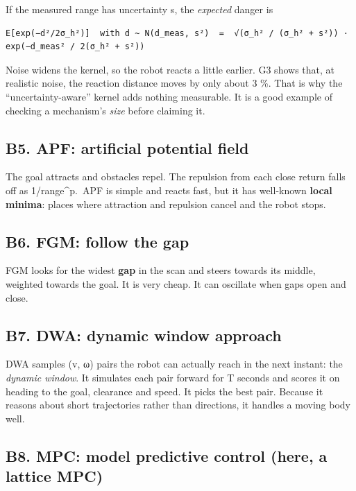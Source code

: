 \documentclass[
  10.5pt,
  a4paper,
]{article}
\begin{document}
If the measured range has uncertainty s, the \emph{expected} danger is

\begin{verbatim}
E[exp(−d²/2σ_h²)]  with d ~ N(d_meas, s²)  =  √(σ_h² / (σ_h² + s²)) · exp(−d_meas² / 2(σ_h² + s²))
\end{verbatim}

Noise widens the kernel, so the robot reacts a little earlier. G3 shows
that, at realistic noise, the reaction distance moves by only about 3
\%. That is why the ``uncertainty-aware'' kernel adds nothing
measurable. It is a good example of checking a mechanism's \emph{size}
before claiming it.

\hypertarget{b5.-apf-artificial-potential-field}{%
\subsection{B5. APF: artificial potential
field}\label{b5.-apf-artificial-potential-field}}

The goal attracts and obstacles repel. The repulsion from each close
return falls off as 1/range\^{}p.~APF is simple and reacts fast, but it
has well-known \textbf{local minima}: places where attraction and
repulsion cancel and the robot stops.

\hypertarget{b6.-fgm-follow-the-gap}{%
\subsection{B6. FGM: follow the gap}\label{b6.-fgm-follow-the-gap}}

FGM looks for the widest \textbf{gap} in the scan and steers towards its
middle, weighted towards the goal. It is very cheap. It can oscillate
when gaps open and close.

\hypertarget{b7.-dwa-dynamic-window-approach}{%
\subsection{B7. DWA: dynamic window
approach}\label{b7.-dwa-dynamic-window-approach}}

DWA samples (v, ω) pairs the robot can actually reach in the next
instant: the \emph{dynamic window}. It simulates each pair forward for T
seconds and scores it on heading to the goal, clearance and speed. It
picks the best pair. Because it reasons about short trajectories rather
than directions, it handles a moving body well.

\hypertarget{b8.-mpc-model-predictive-control-here-a-lattice-mpc}{%
\subsection{B8. MPC: model predictive control (here, a lattice
MPC)}\label{b8.-mpc-model-predictive-control-here-a-lattice-mpc}}
\end{document}
